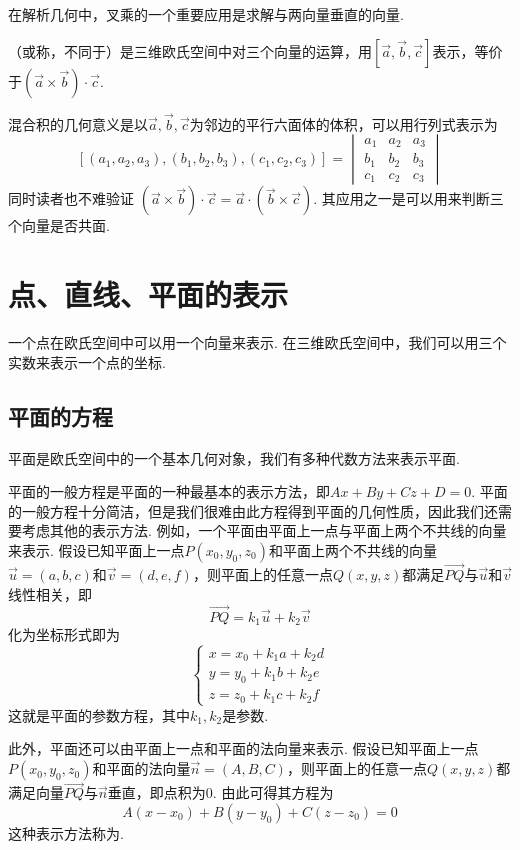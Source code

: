 在解析几何中，叉乘的一个重要应用是求解与两向量垂直的向量.
\begin{definition}
    （或称，不同于）是三维欧氏空间中对三个向量的运算，用$[\vec{a},\vec{b},\vec{c}]$表示，等价于$(\vec{a}\times\vec{b})\cdot\vec{c}$.
\end{definition}
混合积的几何意义是以$\vec{a},\vec{b},\vec{c}$为邻边的平行六面体的体积，可以用行列式表示为
\[[(a_1,a_2,a_3),(b_1,b_2,b_3),(c_1,c_2,c_3)]=\begin{vmatrix}
        a_1 & a_2 & a_3 \\
        b_1 & b_2 & b_3 \\
        c_1 & c_2 & c_3
    \end{vmatrix}\]
同时读者也不难验证 $ (\vec{a}\times\vec{b})\cdot\vec{c} = \vec{a}\cdot(\vec{b}\times\vec{c}) $. 其应用之一是可以用来判断三个向量是否共面.

\section{点、直线、平面的表示}

一个点在欧氏空间中可以用一个向量来表示. 在三维欧氏空间中，我们可以用三个实数来表示一个点的坐标.

\subsection{平面的方程}

平面是欧氏空间中的一个基本几何对象，我们有多种代数方法来表示平面.

平面的一般方程是平面的一种最基本的表示方法，即$Ax+By+Cz+D=0$. 平面的一般方程十分简洁，但是我们很难由此方程得到平面的几何性质，因此我们还需要考虑其他的表示方法. 例如，一个平面由平面上一点与平面上两个不共线的向量来表示. 假设已知平面上一点$P(x_0,y_0,z_0)$和平面上两个不共线的向量$\vec{u}=(a,b,c)$和$\vec{v}=(d,e,f)$，则平面上的任意一点$Q(x,y,z)$都满足$\overrightarrow{PQ}$与$\vec{u}$和$\vec{v}$线性相关，即
\[\overrightarrow{PQ}=k_1\vec{u}+k_2\vec{v}\]
化为坐标形式即为
\[\begin{cases}
        x=x_0+k_1a+k_2d \\
        y=y_0+k_1b+k_2e \\
        z=z_0+k_1c+k_2f
    \end{cases}\]
这就是平面的参数方程，其中$k_1,k_2$是参数.

此外，平面还可以由平面上一点和平面的法向量来表示. 假设已知平面上一点$P(x_0,y_0,z_0)$和平面的法向量$\vec{n}=(A,B,C)$，则平面上的任意一点$Q(x,y,z)$都满足向量$\overrightarrow{PQ}$与$\vec{n}$垂直，即点积为$0$. 由此可得其方程为\[A(x-x_0)+B(y-y_0)+C(z-z_0)=0\]这种表示方法称为.

